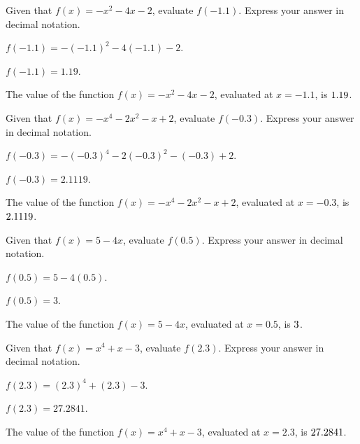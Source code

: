 \begin{shuffle}
\begin{exercise}
Given that $f(x)=-x^2-4 x-2$, evaluate $f(-1.1)$. Express your answer in decimal notation.
\begin{solution}
\begin{hint}
$f(-1.1)=-(-1.1)^2-4 (-1.1)-2$.
\end{hint}
\begin{hint}
$f(-1.1)=1.19$.
\end{hint}
The value of the function $f(x) = -x^2-4 x-2$, evaluated at $x=-1.1$, is ${1.19}$.
\end{solution}
\end{exercise}

\begin{exercise}
Given that $f(x)=-x^4-2 x^2-x+2$, evaluate $f(-0.3)$. Express your answer in decimal notation.
\begin{solution}
\begin{hint}
$f(-0.3)=-(-0.3)^4-2 (-0.3)^2-(-0.3)+2$.
\end{hint}
\begin{hint}
$f(-0.3)=2.1119$.
\end{hint}
The value of the function $f(x) = -x^4-2 x^2-x+2$, evaluated at $x=-0.3$, is ${2.1119}$.
\end{solution}
\end{exercise}

\begin{exercise}
Given that $f(x)=5-4 x$, evaluate $f(0.5)$. Express your answer in decimal notation.
\begin{solution}
\begin{hint}
$f(0.5)=5-4 (0.5)$.
\end{hint}
\begin{hint}
$f(0.5)=3$.
\end{hint}
The value of the function $f(x) = 5-4 x$, evaluated at $x=0.5$, is ${3}$.
\end{solution}
\end{exercise}

\begin{exercise}
Given that $f(x)=x^4+x-3$, evaluate $f(2.3)$. Express your answer in decimal notation.
\begin{solution}
\begin{hint}
$f(2.3)=(2.3)^4+(2.3)-3$.
\end{hint}
\begin{hint}
$f(2.3)=27.2841$.
\end{hint}
The value of the function $f(x) = x^4+x-3$, evaluated at $x=2.3$, is ${27.2841}$.
\end{solution}
\end{exercise}
\end{shuffle}


